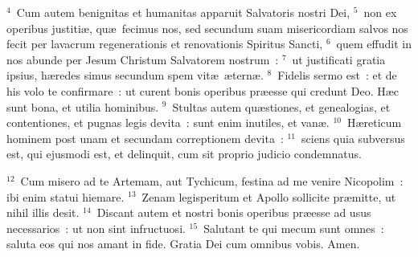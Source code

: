 ${}^{4}$~Cum autem benignitas et humanitas apparuit Salvatoris nostri Dei,
${}^{5}$~non ex operibus justiti\ae , qu\ae\ fecimus nos, sed secundum suam misericordiam salvos nos fecit per lavacrum regenerationis et renovationis Spiritus Sancti,
${}^{6}$~quem effudit in nos abunde per Jesum Christum Salvatorem nostrum~:
${}^{7}$~ut justificati gratia ipsius, h\ae redes simus secundum spem vit\ae\ \ae tern\ae .
${}^{8}$~Fidelis sermo est~: et de his volo te confirmare~: ut curent bonis operibus pr\ae esse qui credunt Deo. H\ae c sunt bona, et utilia hominibus.
${}^{9}$~Stultas autem qu\ae stiones, et genealogias, et contentiones, et pugnas legis devita~: sunt enim inutiles, et van\ae .
${}^{10}$~H\ae reticum hominem post unam et secundam correptionem devita~:
${}^{11}$~sciens quia subversus est, qui ejusmodi est, et delinquit, cum sit proprio judicio condemnatus.


${}^{12}$~Cum misero ad te Artemam, aut Tychicum, festina ad me venire Nicopolim~: ibi enim statui hiemare.
${}^{13}$~Zenam legisperitum et Apollo sollicite pr\ae mitte, ut nihil illis desit.
${}^{14}$~Discant autem et nostri bonis operibus pr\ae esse ad usus necessarios~: ut non sint infructuosi.
${}^{15}$~Salutant te qui mecum sunt omnes~: saluta eos qui nos amant in fide. Gratia Dei cum omnibus vobis. Amen.
